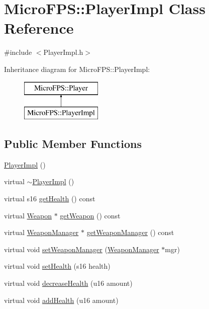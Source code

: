 \hypertarget{class_micro_f_p_s_1_1_player_impl}{
\section{MicroFPS::PlayerImpl Class Reference}
\label{df/dad/class_micro_f_p_s_1_1_player_impl}
}


{\ttfamily \#include $<$PlayerImpl.h$>$}

Inheritance diagram for MicroFPS::PlayerImpl:\begin{figure}[H]
\begin{center}
\leavevmode
\includegraphics[height=2.000000cm]{df/dad/class_micro_f_p_s_1_1_player_impl}
\end{center}
\end{figure}
\subsection*{Public Member Functions}
\begin{DoxyCompactItemize}
\item 
\hyperlink{class_micro_f_p_s_1_1_player_impl_ab1ca9a287b53f3f0561a667f0cf26fdd}{PlayerImpl} ()
\item 
virtual \hyperlink{class_micro_f_p_s_1_1_player_impl_a8fab4c7bef1ab0d31048a4cfd443b75f}{$\sim$PlayerImpl} ()
\item 
virtual s16 \hyperlink{class_micro_f_p_s_1_1_player_impl_a7fd93d1ce2555492b8959cb62c9e9820}{getHealth} () const 
\item 
virtual \hyperlink{class_micro_f_p_s_1_1_weapon}{Weapon} $\ast$ \hyperlink{class_micro_f_p_s_1_1_player_impl_a91ad224c4e19604711e650a8552bcdde}{getWeapon} () const 
\item 
virtual \hyperlink{class_micro_f_p_s_1_1_weapon_manager}{WeaponManager} $\ast$ \hyperlink{class_micro_f_p_s_1_1_player_impl_ac9c28a319fd83b1a10aca306e0693905}{getWeaponManager} () const 
\item 
virtual void \hyperlink{class_micro_f_p_s_1_1_player_impl_a5d82f20e5a716af9d4408c361cdceabb}{setWeaponManager} (\hyperlink{class_micro_f_p_s_1_1_weapon_manager}{WeaponManager} $\ast$mgr)
\item 
virtual void \hyperlink{class_micro_f_p_s_1_1_player_impl_a94de84c70f846f4c59f0079d72b81bc9}{setHealth} (s16 health)
\item 
virtual void \hyperlink{class_micro_f_p_s_1_1_player_impl_aa36c4c832a2b6318d596a2465eb0a7dd}{decreaseHealth} (u16 amount)
\item 
virtual void \hyperlink{class_micro_f_p_s_1_1_player_impl_a058ce6f4c367471d112c536f57abd838}{addHealth} (u16 amount)
\end{DoxyCompactItemize}


